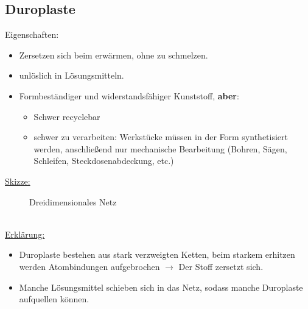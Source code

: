 \documentclass[../../main.tex]{subfiles}
\begin{document}
\subsection{Duroplaste}
Eigenschaften:
\begin{itemize}
    \item Zersetzen sich beim erwärmen, ohne zu schmelzen.
    \item unlöslich in Lösungsmitteln.
    \item Formbeständiger und widerstandsfähiger Kunststoff, \textbf{aber}:
        \begin{itemize}
            \item Schwer recyclebar
            \item schwer zu verarbeiten: Werkstücke müssen in der Form
                synthetisiert werden, anschließend nur mechanische Bearbeitung
                (Bohren, Sägen, Schleifen, Steckdosenabdeckung, etc.)
        \end{itemize}
\end{itemize}
\underline{Skizze:}
\begin{figure}[ht]
    \centering
    \caption{Dreidimensionales Netz}
    \label{fig:skizze_duroplaste}
\end{figure}
%
\\
\underline{Erklärung:}
\begin{itemize}
    \item Duroplaste bestehen aus stark verzweigten Ketten, beim starkem
        erhitzen werden Atombindungen aufgebrochen $\rightarrow$ Der Stoff
        zersetzt sich. 
    \item  Manche Lösungsmittel schieben sich in das Netz, sodass manche
        Duroplaste aufquellen können.
\end{itemize}
%
%
\end{document}
